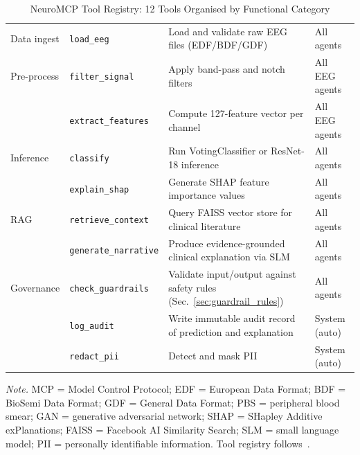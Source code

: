 {\tablestripes\tablefontsize

\begin{xltabular}{\textwidth}{@{} >{\raggedright\arraybackslash}p{1.0cm} >{\raggedright\arraybackslash}p{1.0cm} p{8.0cm} >{\raggedright\arraybackslash}p{4.2cm} @{}}
\caption[NeuroMCP Tool Registry]{NeuroMCP Tool Registry: 12 Tools Organised by Functional Category}\label{tab:mcp_tools} \\
\toprule
{} &  &  &  \\
\midrule
\endfirsthead
\endhead
\bottomrule
\endlastfoot
Data ingest & {\texttt{load\_\allowbreak eeg}} & Load and validate raw EEG files (EDF/BDF/GDF) & All agents \\
\addlinespace
Pre-process & {\texttt{filter\_\allowbreak signal}} & Apply band-pass and notch filters & All EEG agents \\
\addlinespace
 & {\texttt{extract\_\allowbreak features}} & Compute 127-feature vector per channel & All EEG agents \\
\addlinespace
Inference & {\texttt{classify}} & Run VotingClassifier or ResNet-18 inference & All agents \\
\addlinespace
 & {\texttt{explain\_\allowbreak shap}} & Generate SHAP feature importance values & All agents \\
\addlinespace
RAG & {\texttt{retrieve\_\allowbreak context}} & Query FAISS vector store for clinical literature & All agents \\
\addlinespace
 & {\texttt{generate\_\allowbreak narrative}} & Produce evidence-grounded clinical explanation via SLM & All agents \\
\addlinespace
Governance & {\texttt{check\_\allowbreak guardrails}} & Validate input/output against safety rules (Sec.~\ref{sec:guardrail_rules}) & All agents \\
\addlinespace
 & {\texttt{log\_\allowbreak audit}} & Write immutable audit record of prediction and explanation & System (auto) \\
\addlinespace
 & {\texttt{redact\_\allowbreak pii}} & Detect and mask PII & System (auto) \\
\end{xltabular}}
\vspace{0.5em}\noindent\textit{Note.} MCP = Model Control Protocol; EDF = European Data Format; BDF = BioSemi Data Format; GDF = General Data Format; PBS = peripheral blood smear; GAN = generative adversarial network; SHAP = SHapley Additive exPlanations; FAISS = Facebook AI Similarity Search; SLM = small language model; PII = personally identifiable information. Tool registry follows~\cite{asthana2025eegmaster}.

